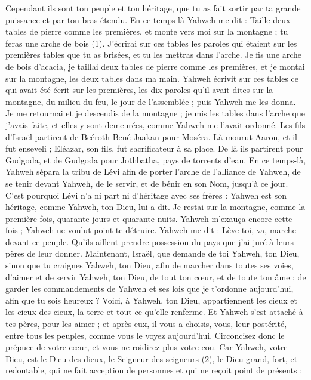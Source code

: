 \begin{multicols}{2}
Cependant ils sont ton peuple et ton héritage, que tu as fait sortir par ta grande puissance et par ton bras étendu.
\VerseOne{}En ce temps-là Yahweh me dit : Taille deux tables de pierre comme les premières, et monte vers moi sur la montagne ; tu feras une arche de bois (1).
J'écrirai sur ces tables les paroles qui étaient sur les premières tables que tu as brisées, et tu les mettras dans l'arche.
Je fis une arche de bois d’acacia, je taillai deux tables de pierre comme les premières, et je montai sur la montagne, les deux tables dans ma main.
Yahweh écrivit sur ces tables ce qui avait été écrit sur les premières, les dix paroles qu’il avait dites sur la montagne, du milieu du feu, le jour de l'assemblée ; puis Yahweh me les donna.
Je me retournai et je descendis de la montagne ; je mis les tables dans l'arche que j'avais faite, et elles y sont demeurées, comme Yahweh me l'avait ordonné.
Les fils d'Israël partirent de Beéroth-Bené Jaakan pour Moséra. Là mourut Aaron, et il fut enseveli ; Eléazar, son fils, fut sacrificateur à sa place.
De là ils partirent pour Gudgoda, et de Gudgoda pour Jothbatha, pays de torrents d'eau.
En ce temps-là, Yahweh sépara la tribu de Lévi afin de porter l'arche de l'alliance de Yahweh, de se tenir devant Yahweh, de le servir, et de bénir en son Nom, jusqu'à ce jour.
C'est pourquoi Lévi n'a ni part ni d'héritage avec ses frères : Yahweh est son héritage, comme Yahweh, ton Dieu, lui a dit.
Je restai sur la montagne, comme la première fois, quarante jours et quarante nuits. Yahweh m'exauça encore cette fois ; Yahweh ne voulut point te détruire.
Yahweh me dit : Lève-toi, va, marche devant ce peuple. Qu'ils aillent prendre possession du pays que j'ai juré à leurs pères de leur donner.
Maintenant, Israël, que demande de toi Yahweh, ton Dieu, sinon que tu craignes Yahweh, ton Dieu, afin de marcher dans toutes ses voies, d’aimer et de servir Yahweh, ton Dieu, de tout ton cœur, et de toute ton âme ;
de garder les commandements de Yahweh et ses lois que je t’ordonne aujourd'hui, afin que tu sois heureux ?
Voici, à Yahweh, ton Dieu, appartiennent les cieux et les cieux des cieux, la terre et tout ce qu’elle renferme.
Et Yahweh s’est attaché à tes pères, pour les aimer ; et après eux, il vous a choisis, vous, leur postérité, entre tous les peuples, comme vous le voyez aujourd'hui.
Circoncisez donc le prépuce de votre cœur, et vous ne roidirez plus votre cou.
Car Yahweh, votre Dieu, est le Dieu des dieux, le Seigneur des seigneurs (2), le Dieu grand, fort, et redoutable, qui ne fait acception de personnes et qui ne reçoit point de présents ;

\end{multicols}
